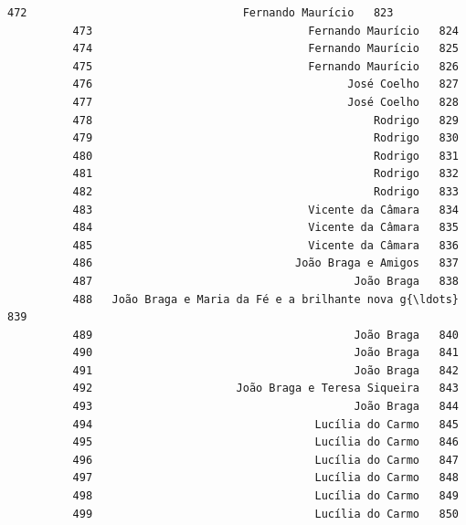 \documentclass[11pt]{article}
\begin{document}
\begin{Verbatim}[commandchars=\\\{\}]
          472                                 Fernando Maurício   823   
          473                                 Fernando Maurício   824   
          474                                 Fernando Maurício   825   
          475                                 Fernando Maurício   826   
          476                                       José Coelho   827   
          477                                       José Coelho   828   
          478                                           Rodrigo   829   
          479                                           Rodrigo   830   
          480                                           Rodrigo   831   
          481                                           Rodrigo   832   
          482                                           Rodrigo   833   
          483                                 Vicente da Câmara   834   
          484                                 Vicente da Câmara   835   
          485                                 Vicente da Câmara   836   
          486                               João Braga e Amigos   837   
          487                                        João Braga   838   
          488   João Braga e Maria da Fé e a brilhante nova g{\ldots}  839   
          489                                        João Braga   840   
          490                                        João Braga   841   
          491                                        João Braga   842   
          492                      João Braga e Teresa Siqueira   843   
          493                                        João Braga   844   
          494                                  Lucília do Carmo   845   
          495                                  Lucília do Carmo   846   
          496                                  Lucília do Carmo   847   
          497                                  Lucília do Carmo   848   
          498                                  Lucília do Carmo   849   
          499                                  Lucília do Carmo   850   
          

\end{Verbatim}
\end{document}

